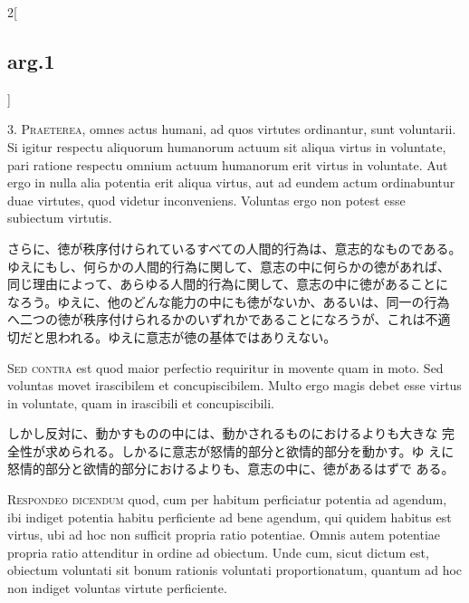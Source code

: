 \documentclass[paper=a4paper,fontsize=10pt,jafontsize=9pt,titlepage]{jlreq}
\begin{document}
\begin{paracol}{2}[\subsection{arg.1}]

3. {\scshape Praeterea}, omnes actus humani, ad quos virtutes
ordinantur, sunt voluntarii. Si igitur respectu aliquorum humanorum
actuum sit aliqua virtus in voluntate, pari ratione respectu omnium
actuum humanorum erit virtus in voluntate. Aut ergo in nulla alia
potentia erit aliqua virtus, aut ad eundem actum ordinabuntur duae
virtutes, quod videtur inconveniens. Voluntas ergo non potest esse
subiectum virtutis.

\switchcolumn

さらに、徳が秩序付けられているすべての人間的行為は、意志的なものである。
ゆえにもし、何らかの人間的行為に関して、意志の中に何らかの徳があれば、
同じ理由によって、あらゆる人間的行為に関して、意志の中に徳があることに
なろう。ゆえに、他のどんな能力の中にも徳がないか、あるいは、同一の行為
へ二つの徳が秩序付けられるかのいずれかであることになろうが、これは不適
切だと思われる。ゆえに意志が徳の基体ではありえない。

\switchcolumn*[\subsection{s.c.}]

{\scshape Sed contra} est quod maior perfectio requiritur in movente
quam in moto. Sed voluntas movet irascibilem et concupiscibilem. Multo
ergo magis debet esse virtus in voluntate, quam in irascibili et
concupiscibili.

\switchcolumn

しかし反対に、動かすものの中には、動かされるものにおけるよりも大きな
 完全性が求められる。しかるに意志が怒情的部分と欲情的部分を動かす。ゆ
 えに怒情的部分と欲情的部分におけるよりも、意志の中に、徳があるはずで
 ある。


{\scshape Respondeo dicendum} quod, cum per habitum perficiatur
potentia ad agendum, ibi indiget potentia habitu perficiente ad bene
agendum, qui quidem habitus est virtus, ubi ad hoc non sufficit
propria ratio potentiae. Omnis autem potentiae propria ratio
attenditur in ordine ad obiectum. Unde cum, sicut dictum est, obiectum
voluntati sit bonum rationis voluntati proportionatum, quantum ad hoc
 non indiget voluntas virtute perficiente.


\end{paracol}
\end{document}
